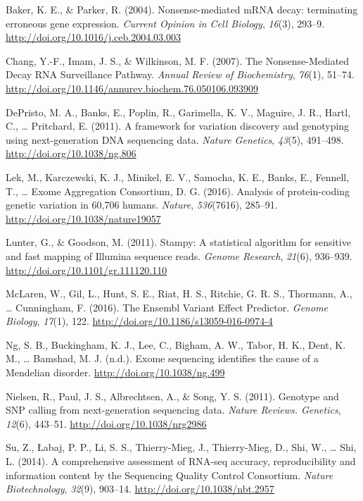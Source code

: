 \documentclass[12pt,twoside]{reedthesis}
\theoremstyle{definition}
\theoremstyle{definition}
\theoremstyle{remark}
\begin{document}
  \hypertarget{refs}{}
  \hypertarget{ref-Baker2004}{}
  Baker, K. E., \& Parker, R. (2004). Nonsense-mediated mRNA decay:
  terminating erroneous gene expression. \emph{Current Opinion in Cell
  Biology}, \emph{16}(3), 293--9.
  \url{http://doi.org/10.1016/j.ceb.2004.03.003}
  
  \hypertarget{ref-Chang2007}{}
  Chang, Y.-F., Imam, J. S., \& Wilkinson, M. F. (2007). The
  Nonsense-Mediated Decay RNA Surveillance Pathway. \emph{Annual Review of
  Biochemistry}, \emph{76}(1), 51--74.
  \url{http://doi.org/10.1146/annurev.biochem.76.050106.093909}
  
  \hypertarget{ref-DePristo2011}{}
  DePristo, M. A., Banks, E., Poplin, R., Garimella, K. V., Maguire, J.
  R., Hartl, C., \ldots{} Pritchard, E. (2011). A framework for variation
  discovery and genotyping using next-generation DNA sequencing data.
  \emph{Nature Genetics}, \emph{43}(5), 491--498.
  \url{http://doi.org/10.1038/ng.806}
  
  \hypertarget{ref-Lek2016}{}
  Lek, M., Karczewski, K. J., Minikel, E. V., Samocha, K. E., Banks, E.,
  Fennell, T., \ldots{} Exome Aggregation Consortium, D. G. (2016).
  Analysis of protein-coding genetic variation in 60,706 humans.
  \emph{Nature}, \emph{536}(7616), 285--91.
  \url{http://doi.org/10.1038/nature19057}
  
  \hypertarget{ref-Lunter2011}{}
  Lunter, G., \& Goodson, M. (2011). Stampy: A statistical algorithm for
  sensitive and fast mapping of Illumina sequence reads. \emph{Genome
  Research}, \emph{21}(6), 936--939.
  \url{http://doi.org/10.1101/gr.111120.110}
  
  \hypertarget{ref-McLaren2016}{}
  McLaren, W., Gil, L., Hunt, S. E., Riat, H. S., Ritchie, G. R. S.,
  Thormann, A., \ldots{} Cunningham, F. (2016). The Ensembl Variant Effect
  Predictor. \emph{Genome Biology}, \emph{17}(1), 122.
  \url{http://doi.org/10.1186/s13059-016-0974-4}
  
  \hypertarget{ref-Ng}{}
  Ng, S. B., Buckingham, K. J., Lee, C., Bigham, A. W., Tabor, H. K.,
  Dent, K. M., \ldots{} Bamshad, M. J. (n.d.). Exome sequencing identifies
  the cause of a Mendelian disorder. \url{http://doi.org/10.1038/ng.499}
  
  \hypertarget{ref-Nielsen2011}{}
  Nielsen, R., Paul, J. S., Albrechtsen, A., \& Song, Y. S. (2011).
  Genotype and SNP calling from next-generation sequencing data.
  \emph{Nature Reviews. Genetics}, \emph{12}(6), 443--51.
  \url{http://doi.org/10.1038/nrg2986}
  
  \hypertarget{ref-Su2014}{}
  Su, Z., Łabaj, P. P., Li, S. S., Thierry-Mieg, J., Thierry-Mieg, D.,
  Shi, W., \ldots{} Shi, L. (2014). A comprehensive assessment of RNA-seq
  accuracy, reproducibility and information content by the Sequencing
  Quality Control Consortium. \emph{Nature Biotechnology}, \emph{32}(9),
  903--14. \url{http://doi.org/10.1038/nbt.2957}


\end{document}
